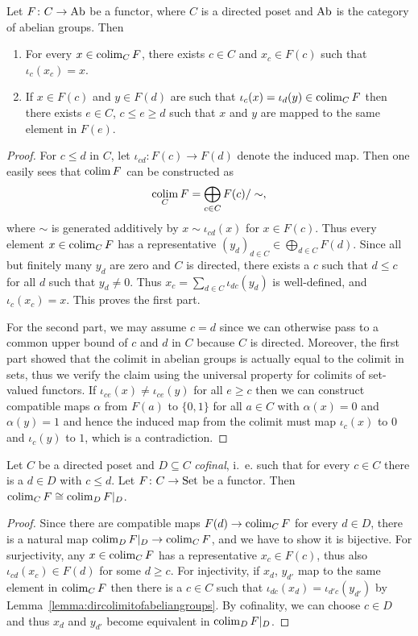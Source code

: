 \documentclass[a4paper,openany]{scrbook}
\begin{document}
\begin{lemma}\label{lemma:dircolimitofabeliangroups}
Let $F\colon C \to \operatorname{Ab}$ be a functor, where $C$ is a directed poset and $\operatorname{Ab}$ is the category of abelian groups. Then
\begin{enumerate}
\item For every $x \in \operatorname*{colim}_C F$, there exists $c \in C$ and $x_c \in F(c)$ such that $\iota_c(x_c)=x$.
\item If $x \in F(c)$ and $y \in F(d)$ are such that $\iota_c(x)=\iota_d(y) \in \operatorname*{colim}_C F$ then there exists $e \in C$, $c \leq e \geq d$ such that $x$ and $y$ are mapped to the same element in $F(e)$.
\end{enumerate}
\end{lemma}
\begin{proof}
For $c \leq d$ in $C$, let $\iota_{cd}\colon F(c) \to F(d)$ denote the induced map. Then one easily sees that $\operatorname*{colim} F$ can be constructed as
\[
\operatorname*{colim}_C F = \bigoplus_{c \in C} F(c)/\sim,
\]
where $\sim$ is generated additively by $x \sim \iota_{cd}(x)$ for $x \in F(c)$. Thus every element $x \in \operatorname*{colim}_C F$ has a representative $(y_d)_{d \in C} \in \bigoplus_{d \in C} F(d)$. Since all but finitely many $y_d$ are zero and $C$ is directed, there exists a $c$ such that $d \leq c$ for all $d$ such that $y_d \neq 0$. Thus $x_c = \sum_{d \in C} \iota_{dc}(y_d)$ is well-defined, and $\iota_c(x_c) = x$. This proves the first part.

For the second part, we may assume $c=d$ since we can otherwise pass to a common upper bound of $c$ and $d$ in $C$ because $C$ is directed. Moreover, the first part showed that the colimit in abelian groups is actually equal to the colimit in sets, thus we verify the claim using the universal property for colimits of set-valued functors.
If $\iota_{ce}(x) \neq \iota_{ce}(y)$ for all $e \geq c$ then we can construct compatible maps $\alpha$ from $F(a)$ to $\{0,1\}$ for all $a \in C$ with $\alpha(x) = 0$ and $\alpha(y) = 1$ and hence the induced map from the colimit must map $\iota_c(x)$ to $0$ and $\iota_c(y)$ to $1$, which is a contradiction.
\end{proof}

\begin{lemma}\label{lemma:cofinalcolimit}
Let $C$ be a directed poset and $D \subseteq C$ \emph{cofinal}, i.~e. such that for every $c \in C$ there is a $d \in D$ with $c \leq d$. Let $F\colon C \to \operatorname{Set}$ be a functor. Then $\operatorname*{colim}_C F \cong \operatorname*{colim}_D F|_D$.
\end{lemma}
\begin{proof}
Since there are compatible maps $F(d) \to \operatorname*{colim}_C F$ for every $d \in D$, there is a natural map $\operatorname*{colim}_D F|_D \to \operatorname*{colim}_C F$, and we have to show it is bijective. For surjectivity, any $x \in \operatorname*{colim}_C F$ has a representative $x_c \in F(c)$, thus also $\iota_{cd}(x_c) \in F(d)$ for some $d \geq c$. For injectivity, if $x_d$, $y_{d'}$ map to the same element in $\operatorname*{colim}_C F$ then there is a $c \in C$ such that $\iota_{dc}(x_d) = \iota_{d'c}(y_{d'})$ by Lemma~\ref{lemma:dircolimitofabeliangroups}. By cofinality, we can choose $c \in D$ and thus $x_d$ and $y_{d'}$ become equivalent in $\operatorname*{colim}_D F|_D$.
\end{proof}
\end{document}
